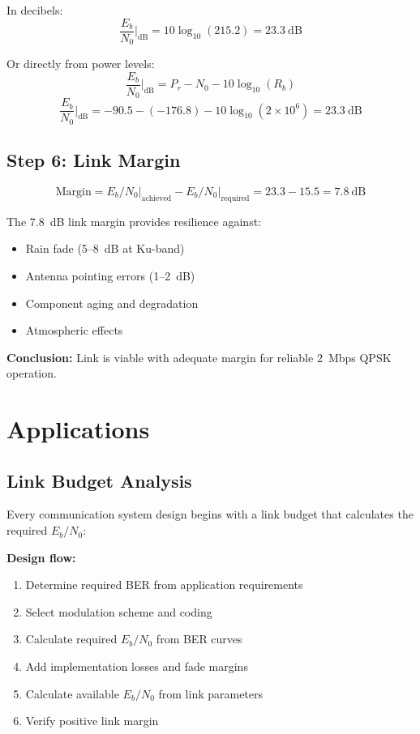 In decibels:
\begin{equation}
\frac{E_b}{N_0}\bigg|_{\text{dB}} = 10\log_{10}(215.2) = 23.3~\text{dB}
\end{equation}

Or directly from power levels:
\begin{equation}
\frac{E_b}{N_0}\bigg|_{\text{dB}} = P_r - N_0 - 10\log_{10}(R_b)
\end{equation}
\begin{equation}
\frac{E_b}{N_0}\bigg|_{\text{dB}} = -90.5 - (-176.8) - 10\log_{10}(2 \times 10^6) = 23.3~\text{dB}
\end{equation}

\subsection*{Step 6: Link Margin}

\begin{equation}
\text{Margin} = E_b/N_0\big|_{\text{achieved}} - E_b/N_0\big|_{\text{required}} = 23.3 - 15.5 = 7.8~\text{dB}
\end{equation}

\begin{keyconcept}
The 7.8~dB link margin provides resilience against:
\begin{itemize}
\item Rain fade (5--8~dB at Ku-band)
\item Antenna pointing errors (1--2~dB)
\item Component aging and degradation
\item Atmospheric effects
\end{itemize}
\textbf{Conclusion:} Link is viable with adequate margin for reliable 2~Mbps QPSK operation.
\end{keyconcept}

\section{Applications}

\subsection{Link Budget Analysis}

Every communication system design begins with a link budget that calculates the required $E_b/N_0$:

\textbf{Design flow:}
\begin{enumerate}
\item Determine required BER from application requirements
\item Select modulation scheme and coding
\item Calculate required $E_b/N_0$ from BER curves
\item Add implementation losses and fade margins
\item Calculate available $E_b/N_0$ from link parameters
\item Verify positive link margin
\end{enumerate}

